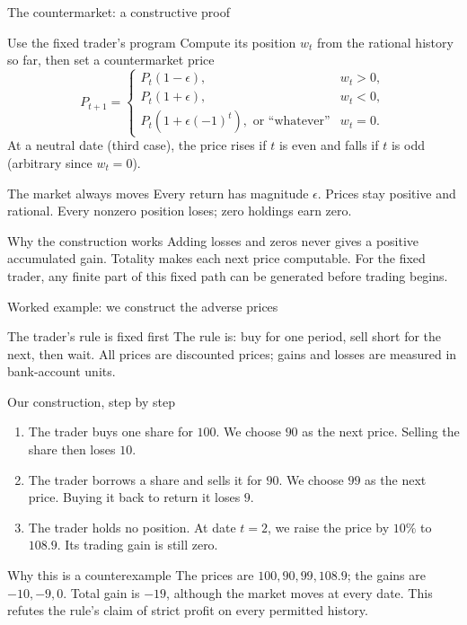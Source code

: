 \documentclass{beamer}
\begin{document}
\begin{frame}{The countermarket: a constructive proof}
\small
\begin{block}{Use the fixed trader's program}
Compute its position $w_t$ from the rational history so far, then set a countermarket price
\[
P_{t+1}=
\begin{cases}
P_t(1-\epsilon),&w_t>0,\\
P_t(1+\epsilon),&w_t<0,\\
P_t(1+\epsilon(-1)^t),\text{ or ``whatever''}&w_t=0.
\end{cases}
\]
At a neutral date (third case), the price rises if $t$ is even and falls if $t$ is odd (arbitrary since $w_t=0$).
\end{block}
\begin{exampleblock}{The market always moves}
Every return has magnitude $\epsilon$. Prices stay positive and rational.
Every nonzero position loses; zero holdings earn zero.
\end{exampleblock}
\begin{alertblock}{Why the construction works}
Adding losses and zeros never gives a positive accumulated gain.
Totality makes each next price computable. For the fixed trader,
any finite part of this fixed path can be generated before trading begins.
\end{alertblock}
\end{frame}

\begin{frame}[shrink=5]{Worked example: we construct the adverse prices}
\small
\begin{block}{The trader's rule is fixed first}
The rule is: buy for one period, sell short for the next, then wait.
All prices are discounted prices; gains and losses are measured in
bank-account units.
\end{block}
\begin{exampleblock}{Our construction, step by step}
\begin{enumerate}
\setlength{\itemsep}{0.55em}
\item The trader buys one share for $100$.\newline
We choose $90$ as the next price. Selling the share then loses $10$.
\item The trader borrows a share and sells it for $90$.\newline
We choose $99$ as the next price. Buying it back to return it loses $9$.
\item The trader holds no position.\newline
At date $t=2$, we raise the price by $10\%$ to $108.9$.
Its trading gain is still zero.
\end{enumerate}
\end{exampleblock}
\begin{alertblock}{Why this is a counterexample}
The prices are $100,90,99,108.9$; the gains are $-10,-9,0$.
Total gain is $-19$, although the market moves at every date.
This refutes the rule's claim of strict profit on every permitted history.
\end{alertblock}
\end{frame}
\end{document}
